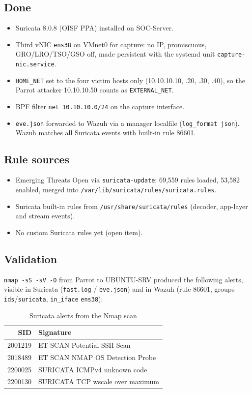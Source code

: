 \documentclass[11pt,a4paper]{article}
\begin{document}
\subsection{Done}
\begin{itemize}
  \item Suricata 8.0.8 (OISF PPA) installed on SOC-Server.
  \item Third vNIC \texttt{ens38} on VMnet0 for capture: no IP, promiscuous,
        GRO/LRO/TSO/GSO off, made persistent with the systemd unit
        \texttt{capture-nic.service}.
  \item \texttt{HOME\_NET} set to the four victim hosts only (10.10.10.10,
        .20, .30, .40), so the Parrot attacker 10.10.10.50 counts as
        \texttt{EXTERNAL\_NET}.
  \item BPF filter \texttt{net 10.10.10.0/24} on the capture interface.
  \item \texttt{eve.json} forwarded to Wazuh via a manager localfile
        (\texttt{log\_format json}). Wazuh matches all Suricata events with
        built-in rule 86601.
\end{itemize}

\subsection{Rule sources}
\begin{itemize}
  \item Emerging Threats Open via \texttt{suricata-update}: 69,559 rules
        loaded, 53,582 enabled, merged into
        \texttt{/var/lib/\allowbreak suricata/\allowbreak rules/\allowbreak suricata.rules}.
  \item Suricata built-in rules from
        \texttt{/usr/share/\allowbreak suricata/\allowbreak rules} (decoder,
        app-layer and stream events).
  \item No custom Suricata rules yet (open item).
\end{itemize}

\subsection{Validation}
\texttt{nmap -sS -sV -O} from Parrot to UBUNTU-SRV produced the following
alerts, visible in Suricata (\texttt{fast.log} / \texttt{eve.json}) and in
Wazuh (rule 86601, groups \texttt{ids}/\texttt{suricata},
\texttt{in\_iface} \texttt{ens38}):

\begin{table}[h]
\centering
\begin{tabular}{rl}
\toprule
SID & Signature \\
\midrule
2001219 & ET SCAN Potential SSH Scan \\
2018489 & ET SCAN NMAP OS Detection Probe \\
2200025 & SURICATA ICMPv4 unknown code \\
2200130 & SURICATA TCP wscale over maximum \\
\bottomrule
\end{tabular}
\caption{Suricata alerts from the Nmap scan}
\end{table}
\end{document}
